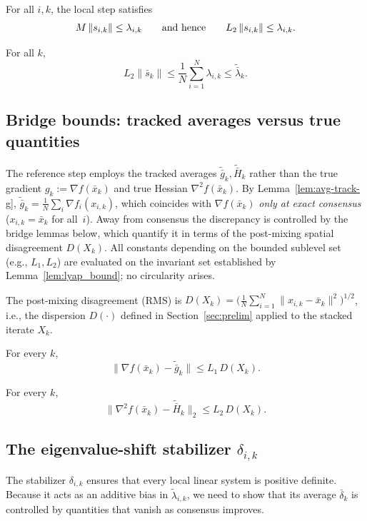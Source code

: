 \documentclass[review,onefignum,onetabnum]{siamart171218}
\begin{document}
\begin{lemma}\label{lem:M-vs-s}
For all $i,k$, the local step satisfies
\[
M\left\|s_{i,k}\right\|\le \lambda_{i,k}
\qquad\text{and hence}\qquad
L_2\left\|s_{i,k}\right\|\le \lambda_{i,k}.
\]
\end{lemma}

\begin{lemma}\label{lem:avg-regime}
For all $k$,
\[
L_2\|\bar s_k\|\le \frac1N\sum_{i=1}^N \lambda_{i,k}\le \tilde{\bar\lambda}_k.
\]
\end{lemma}

\subsection{Bridge bounds: tracked averages versus true quantities}\label{ssec:bridge}
The reference step employs the tracked averages
$\tilde{\bar g}_k,\tilde{\bar H}_k$ rather than the true gradient
$g_k:=\nabla f(\bar x_k)$ and true Hessian
$\nabla^2 f(\bar x_k)$.
By Lemma~\ref{lem:avg-track-g},
$\tilde{\bar g}_k = \frac{1}{N}\sum_{i}\nabla f_i(x_{i,k})$,
which coincides with $\nabla f(\bar x_k)$ \emph{only at exact
consensus} ($x_{i,k}=\bar x_k$ for all~$i$).
Away from consensus the discrepancy is controlled by the
bridge lemmas below, which quantify it in terms of the
post-mixing spatial disagreement $D(X_k)$.
All constants depending on the bounded sublevel set
(e.g., $L_1,L_2$) are evaluated on the invariant set
established by Lemma~\ref{lem:lyap_bound}; no circularity arises.

The post-mixing disagreement (RMS) is
$D(X_k)=\bigl(\frac1N\sum_{i=1}^N \|x_{i,k}-\bar x_k\|^2\bigr)^{1/2}$,
i.e., the dispersion $D(\cdot)$ defined in Section~\ref{sec:prelim}
applied to the stacked iterate $X_k$.

\begin{lemma}\label{lem:bridge-grad}
For every $k$,
\[
\|\nabla f(\bar x_k)-\tilde{\bar g}_k\|\le L_1\,D(X_k).
\]
\end{lemma}

\begin{lemma}\label{lem:bridge-hess}
For every $k$,
\[
\|\nabla^2 f(\bar x_k)-\tilde{\bar H}_k\|_2\le L_2\,D(X_k).
\]
\end{lemma}

\subsection{The eigenvalue-shift stabilizer \texorpdfstring{$\delta_{i,k}$}{delta\_ik}}\label{ssec:stab}
The stabilizer $\delta_{i,k}$ ensures that every local linear system
is positive definite.
Because it acts as an additive bias in $\tilde\lambda_{i,k}$, we need
to show that its average $\bar\delta_k$ is controlled by quantities
that vanish as consensus improves.
\end{document}

